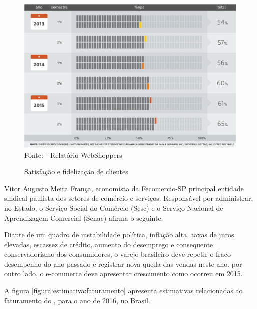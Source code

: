 \documentclass[a4paper,12pt]{monografia}
\begin{document}
\begin{figure}[H]
\centering
\caption{Satisfação e fidelização de clientes}
\centering
\includegraphics[width=12cm]{img/webshoppers/nps.eps}\\
\small{Fonte:  - Relatório WebShoppers}
\label{figura:nps}
\end{figure}

Vitor Augusto Meira França, economista da Fecomercio-SP principal entidade sindical paulista dos setores de comércio e serviços. Responsável por administrar, no Estado, o Serviço Social do Comércio (Sesc) e o Serviço Nacional de Aprendizagem Comercial (Senac) afirma o seguinte:

\begin{citacao}
Diante de um quadro de instabilidade política, inflação alta, taxas de juros elevadas, escassez de crédito, aumento do desemprego e consequente conservadorismo dos consumidores, o varejo brasileiro deve repetir o fraco desempenho do ano passado e registrar nova queda das vendas neste ano. por outro lado, o e-commerce deve apresentar crescimento como ocorreu em 2015. \cite{webshoppers}
\end{citacao}

A figura \ref{figura:estimativa:faturamento} apresenta estimativas relacionadas ao faturamento do , para o ano de 2016, no Brasil.
\end{document}
